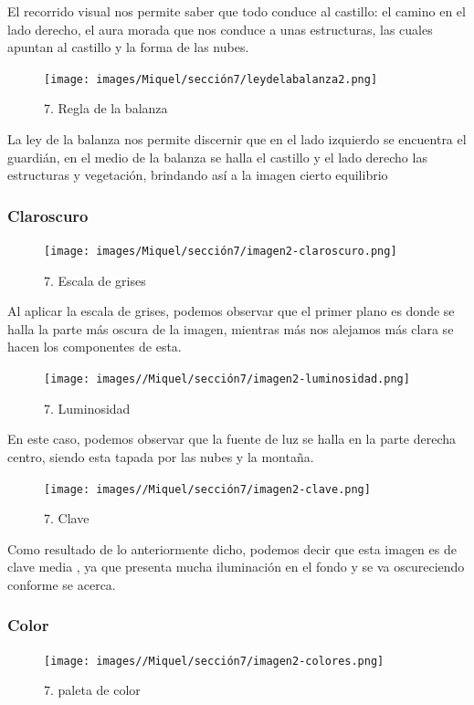 \documentclass[12pt]{article}
\begin{document}
    El recorrido visual nos permite saber que todo conduce al castillo: el camino en el lado derecho, el aura morada  que nos conduce a unas estructuras, las cuales apuntan al castillo y la forma de las nubes.

    \begin{figure}[H]
      \centering
      \texttt{[image: images/Miquel/sección7/leydelabalanza2.png]}
      \caption{\small 7. Regla de la balanza}
    \end{figure}

    La ley de la balanza nos permite discernir que en el lado izquierdo se encuentra el guardián, en el medio de la balanza se halla el castillo y el lado derecho las estructuras y vegetación, brindando así a la imagen cierto equilibrio
   
        \subsubsection{Claroscuro}

    \begin{figure}[H]
      \centering
      \texttt{[image: images/Miquel/sección7/imagen2-claroscuro.png]}
      \caption{\small 7. Escala de grises}
    \end{figure}
    
    Al aplicar la escala de grises, podemos observar que el primer plano es donde se halla la parte más oscura de la imagen, mientras más nos alejamos más clara se hacen los componentes de esta.

    \begin{figure}[H]
      \centering
      \texttt{[image: images//Miquel/sección7/imagen2-luminosidad.png]}
      \caption{\small 7. Luminosidad}
    \end{figure}

    En este caso, podemos observar que la fuente de luz se halla en la parte derecha centro, siendo esta tapada por las nubes y la montaña.
    
    \begin{figure}[H]
      \centering
      \texttt{[image: images//Miquel/sección7/imagen2-clave.png]}
      \caption{\small 7. Clave}
    \end{figure}

    Como resultado de lo anteriormente dicho, podemos decir que esta imagen es de clave media , ya que presenta mucha iluminación en el fondo y se va oscureciendo conforme se acerca.

        \subsubsection{Color}
\begin{figure}[H]
      \centering
      \texttt{[image: images//Miquel/sección7/imagen2-colores.png]}
      \caption{\small 7. paleta de color}
    \end{figure}
\end{document}
